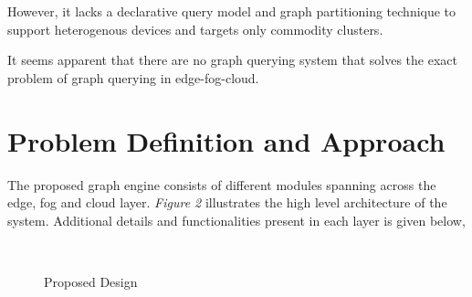 \documentclass[conference]{IEEEtran}
\begin{document}
However, it lacks a declarative query model and graph partitioning technique to support heterogenous devices and targets only commodity clusters.

It seems apparent that there are no graph querying system that solves the exact problem of graph querying in edge-fog-cloud. 

\section{Problem Definition and Approach}

The proposed graph engine consists of different modules spanning across the edge, fog and cloud layer. \emph{Figure 2} illustrates the high level architecture of the system. Additional details and functionalities present in each layer is given below,

\begin{figure}[th]
	\centering%
	\qquad
	\\
	\label{fig:problem-approach}
	\caption{Proposed Design}
	\vspace{-0.1in}
\end{figure} 
\end{document}
